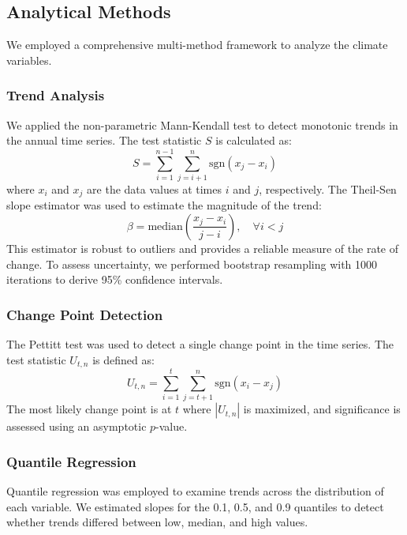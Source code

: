 \documentclass[12pt,a4paper]{article}
\begin{document}
\subsection{Analytical Methods}
We employed a comprehensive multi-method framework to analyze the climate variables.

\subsubsection{Trend Analysis}
We applied the non-parametric Mann-Kendall test \citep{mann1945,kendall1975} to detect monotonic trends in the annual time series. The test statistic $S$ is calculated as:
\begin{equation}
S = \sum_{i=1}^{n-1} \sum_{j=i+1}^{n} \text{sgn}(x_j - x_i)
\end{equation}
where $x_i$ and $x_j$ are the data values at times $i$ and $j$, respectively. The Theil-Sen slope estimator \citep{theil1950,sen1968} was used to estimate the magnitude of the trend:
\begin{equation}
\beta = \text{median}\left(\frac{x_j - x_i}{j - i}\right), \quad \forall i < j
\end{equation}
This estimator is robust to outliers and provides a reliable measure of the rate of change. To assess uncertainty, we performed bootstrap resampling with 1000 iterations to derive 95\% confidence intervals.

\subsubsection{Change Point Detection}
The Pettitt test \citep{pettitt1979} was used to detect a single change point in the time series. The test statistic $U_{t,n}$ is defined as:
\begin{equation}
U_{t,n} = \sum_{i=1}^{t} \sum_{j=t+1}^{n} \text{sgn}(x_i - x_j)
\end{equation}
The most likely change point is at $t$ where $|U_{t,n}|$ is maximized, and significance is assessed using an asymptotic $p$-value.

\subsubsection{Quantile Regression}
Quantile regression \citep{koenker2001} was employed to examine trends across the distribution of each variable. We estimated slopes for the 0.1, 0.5, and 0.9 quantiles to detect whether trends differed between low, median, and high values.
\end{document}
